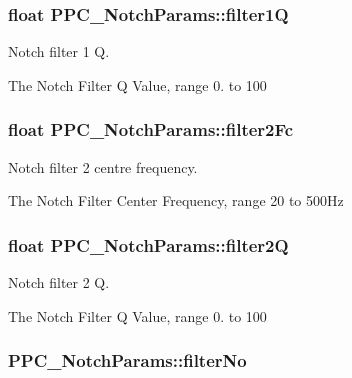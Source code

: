 \subsubsection[{\texorpdfstring{filter1Q}{filter1Q}}]{\setlength{\rightskip}{0pt plus 5cm}float P\+P\+C\+\_\+\+Notch\+Params\+::filter1Q}\hypertarget{struct_p_p_c___notch_params_a0417d4278c90c62376b4febb0a9b40ed}{}\label{struct_p_p_c___notch_params_a0417d4278c90c62376b4febb0a9b40ed}


Notch filter 1 Q. 

The Notch Filter Q Value, range 0. to 100
\subsubsection[{\texorpdfstring{filter2\+Fc}{filter2Fc}}]{\setlength{\rightskip}{0pt plus 5cm}float P\+P\+C\+\_\+\+Notch\+Params\+::filter2\+Fc}\hypertarget{struct_p_p_c___notch_params_acdc4737cbd21c081b7168ffa319f6b5d}{}\label{struct_p_p_c___notch_params_acdc4737cbd21c081b7168ffa319f6b5d}


Notch filter 2 centre frequency. 

The Notch Filter Center Frequency, range 20 to 500\+Hz
\subsubsection[{\texorpdfstring{filter2Q}{filter2Q}}]{\setlength{\rightskip}{0pt plus 5cm}float P\+P\+C\+\_\+\+Notch\+Params\+::filter2Q}\hypertarget{struct_p_p_c___notch_params_a6497c8fb67944986495f43f174b42349}{}\label{struct_p_p_c___notch_params_a6497c8fb67944986495f43f174b42349}


Notch filter 2 Q. 

The Notch Filter Q Value, range 0. to 100
\subsubsection[{\texorpdfstring{filter\+No}{filterNo}}]{ P\+P\+C\+\_\+\+Notch\+Params\+::filter\+No}\hypertarget{struct_p_p_c___notch_params_aeb5edfe4968a29273f6af55b8b4ed669}{}\label{struct_p_p_c___notch_params_aeb5edfe4968a29273f6af55b8b4ed669}


